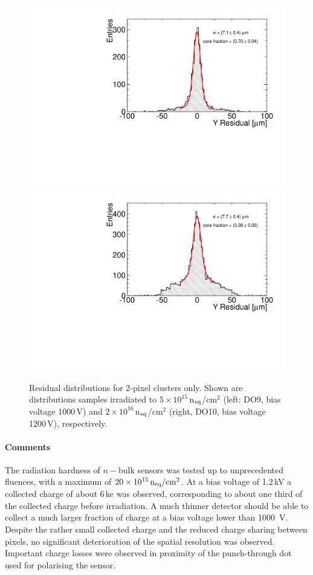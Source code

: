 \begin{figure}[!hbt]
 \begin{center}
  \includegraphics[width=.49\textwidth]{Oct_Period5_1-residuals2-10-cluSize2-multiG_resY.pdf}
  \includegraphics[width=.49\textwidth]{Oct_Period8_1-residuals2-11-cluSize2-multiG_resY.pdf}
 \end{center}
 \caption{Residual distributions for 2-pixel clusters only. Shown are distributions samples irradiated to $5\times 10^{15}$\,n$_{\rm eq}$/cm$^2$ (left: DO9, bias voltage 1000\,V) and $2\times 10^{16}$\,n$_{\rm eq}$/cm$^2$ (right, DO10, bias voltage 1200\,V), respectively. \label{fig:n-in-n:CS2-residuals}}
\end{figure}

\paragraph{Comments}
The radiation hardness of $n-$bulk sensors was tested up to unprecedented fluences, with a maximum of
 $20\times10^{15}\,{\rm n_{eq}}/{\rm cm}^{2}$.
 At a bias voltage of 1.2\,kV a collected charge of about 6\,ke was observed, corresponding to about one 
 third of the collected charge before irradiation. A much thinner detector should be able to collect a much 
 larger fraction of charge at a bias voltage lower than 1000~V.
 Despite the rather small collected charge and the reduced 
 charge sharing between pixels, no significant deterioration of the
 spatial resolution was observed. 
 Important charge losses were observed in proximity of the punch-through dot used for polarising 
 the sensor.

